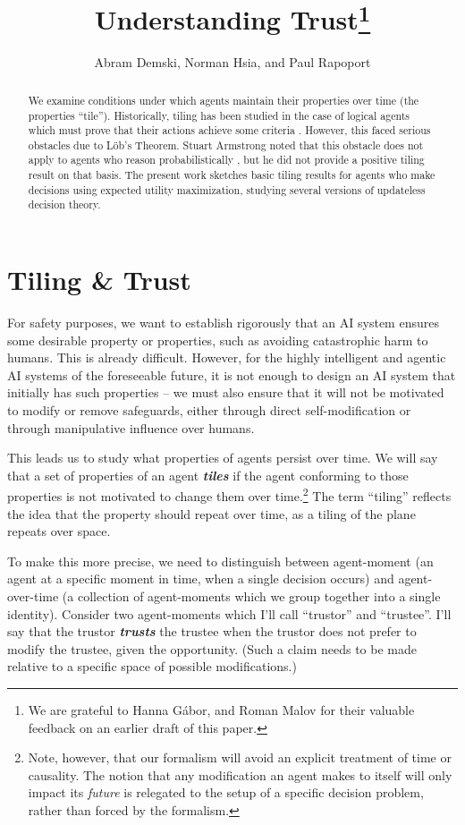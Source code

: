 \documentclass{article}
\title{Understanding Trust\footnote{We are grateful to {\color{violet} Hanna Gábor, and Roman Malov} for their valuable feedback on an earlier draft of this paper.}}
\author{Abram Demski, Norman Hsia, and Paul Rapoport}
\begin{document}
\maketitle

\begin{abstract}
We examine conditions under which agents maintain their properties over time (the properties ``tile''). Historically, tiling has been studied in the case of logical agents which must prove that their actions achieve some criteria \cite{yudkowsky2013tiling}. However, this faced serious obstacles due to L\"ob's Theorem. Stuart Armstrong noted that this obstacle does not apply to agents who reason probabilistically \cite{armstrong2013loeb}, but he did not provide a positive tiling result on that basis. The present work sketches basic tiling results for agents who make decisions using expected utility maximization, studying several versions of updateless decision theory.
\end{abstract}

\section{Tiling \& Trust}

For safety purposes, we want to establish rigorously that an AI system ensures some desirable property or properties, such as avoiding catastrophic harm to humans. This is already difficult. However, for the highly intelligent and agentic AI systems of the foreseeable future, it is not enough to design an AI system that initially has such properties -- we must also ensure that it will not be motivated to modify or remove safeguards, either through direct self-modification or through manipulative influence over humans.

This leads us to study what properties of agents persist over time. We will say that a set of properties of an agent \textit{\textbf{tiles}} if the agent conforming to those properties is not motivated to change them over time.\footnote{Note, however, that our formalism will avoid an explicit treatment of time or causality. The notion that any modification an agent makes to itself will only impact its \emph{future} is relegated to the setup of a specific decision problem, rather than forced by the formalism.} The term ``tiling'' reflects the idea that the property should repeat over time, as a tiling of the plane repeats over space.

To make this more precise, we need to distinguish between agent-moment (an agent at a specific moment in time, when a single decision occurs) and agent-over-time (a collection of agent-moments which we group together into a single identity). Consider two agent-moments which I'll call ``trustor'' and ``trustee''. I'll say that the trustor \textit{\textbf{trusts}} the trustee when the trustor does not prefer to modify the trustee, given the opportunity. (Such a claim needs to be made relative to a specific space of possible modifications.)
\end{document}
